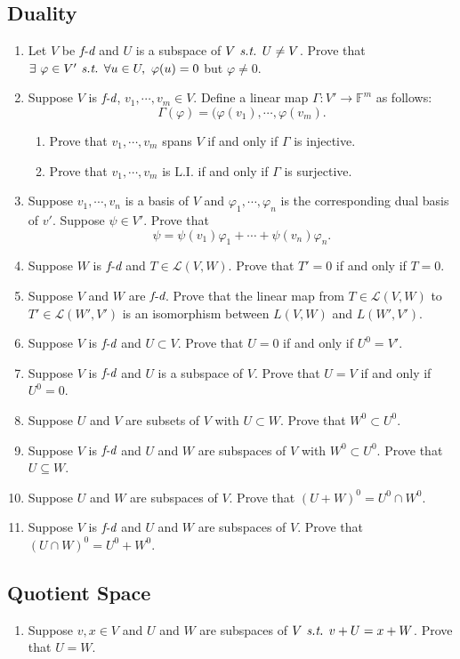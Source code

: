 \documentclass[11pt, letterpaper]{article}
\def\F{\mathbb{F}}
\def\L{\mathcal{L}}
\def\phi{\varphi}
\def\st{\emph{ s.t. }}
\def\LI{\mathrm{L.I.}}
\def\FD{\emph{f-d}}
\begin{document}
\subsection{Duality}
\begin{enumerate}
	\item Let $V$ be $\FD$ and $U$ is a subspace of $V\st U\neq V$. Prove that $\exists\ \phi\in V'\st\forall u\in U,\ \phi(u)=0$ but $\phi\neq0$.
	\item Suppose $V$ is $\FD$, $v_1,\cdots,v_m\in V$. Define a linear map $\Gamma:V'\to\F^m$ as follows: \[\Gamma(\phi)=(\phi(v_1),\cdots,\phi(v_m).\]\begin{enumerate}\item Prove that $v_1,\cdots,v_m$ spans $V$ if and only if $\Gamma$ is injective. \item Prove that $v_1,\cdots,v_m$ is $\LI$ if and only if $\Gamma$ is surjective. \end{enumerate}
	\item Suppose $v_1,\cdots,v_n$ is a basis of $V$ and $\phi_1,\cdots,\phi_n$ is the corresponding dual basis of $v'$. Suppose $\psi\in V'$. Prove that \[\psi=\psi(v_1)\phi_1+\cdots+\psi(v_n)\phi_n.\]
	\item Suppose $W$ is $\FD$ and $T\in\L(V,W)$. Prove that $T'=0$ if and only if $T=0$.
	\item Suppose $V$ and $W$ are $\FD$. Prove that the linear map from $T\in\L(V,W)$ to $T'\in\L(W',V')$ is an isomorphism between $L(V,W)$ and $L(W',V')$.
	\item Suppose $V$ is $\FD$ and $U\subset V$. Prove that $U=\qty{0}$ if and only if $U^0=V'$.
	\item Suppose $V$ is $\FD$ and $U$ is a subspace of $V$. Prove that $U=V$ if and only if $U^0=\qty{0}$.
	\item Suppose $U$ and $V$ are subsets of $V$ with $U\subset W$. Prove that $W^0\subset U^0$.
	\item Suppose $V$ is $\FD$ and $U$ and $W$ are subspaces of $V$ with $W^0\subset U^0$. Prove that $U\subseteq W$.
	\item Suppose $U$ and $W$ are subspaces of $V$. Prove that $(U+W)^0=U^0\cap W^0$.
	\item Suppose $V$ is $\FD$ and $U$ and $W$ are subspaces of $V$. Prove that $(U\cap W)^0=U^0+W^0$.
\end{enumerate}
\subsection{Quotient Space}
\begin{enumerate}
	\item Suppose $v,x\in V$ and $U$ and $W$ are subspaces of $V\st v+U=x+W$. Prove that $U=W$. 
\end{enumerate}
\end{document}
